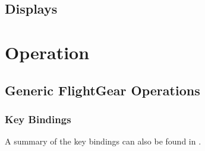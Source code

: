 \documentclass[a4paper]{report}
\newcommand{\AJSonly}[1]{\ifbool{AJS}{#1}{}}
\begin{document}
\chapter{Displays}






\part{Operation}
\chapter{Generic FlightGear Operations}
\section{Key Bindings}
A summary of the key bindings can also be found in .
\end{document}
